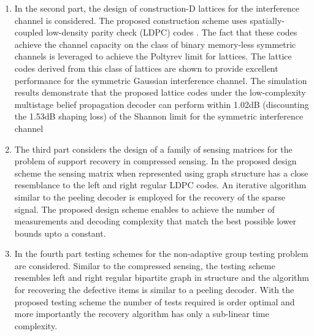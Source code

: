 \begin{enumerate}
\item In the second part, the design of construction-D lattices for the interference channel is considered. The proposed construction scheme uses spatially-coupled low-density parity check (LDPC) codes \cite{felstrom1999time,kudekar2011threshold}. The fact that these codes achieve the channel capacity on the class of binary memory-less symmetric channels is leveraged to achieve the Poltyrev limit for lattices. The lattice codes derived from this class of lattices are shown to provide excellent performance for the symmetric Gaussian interference channel. The simulation results demonstrate that the proposed lattice codes under the low-complexity multistage belief propagation decoder can perform within 1.02dB (discounting the 1.53dB shaping loss) of the Shannon limit for the symmetric interference channel 

\item The third part considers the design of a family of sensing matrices for the problem of support recovery in compressed sensing. In the proposed design scheme the sensing matrix when represented using graph structure has a close resemblance to the left and right regular LDPC codes. An iterative algorithm similar to the peeling decoder is employed for the recovery of the sparse signal. The proposed design scheme enables to achieve the number of measurements and decoding complexity that match the best possible lower bounds upto a constant.%
  

\item In the fourth part testing schemes for the non-adaptive group testing problem are considered. Similar to the compressed sensing, the testing scheme resembles left and right regular bipartite graph in structure and the algorithm for recovering the defective items is similar to a peeling decoder. With the proposed testing scheme the number of tests required is order optimal and more importantly the recovery algorithm has only a sub-linear time complexity.
\end{enumerate} 
\fi